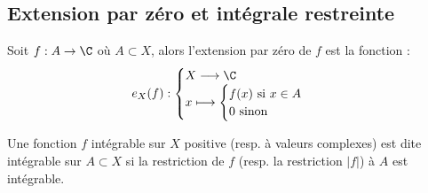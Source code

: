 \subsection{Extension par zéro et intégrale restreinte}

\begin{definition}
    Soit $f : A \rightarrow \C$ où $A \subset X$, alors l'extension par zéro de $f$ est la fonction :
        \[ e_X(f) : 
            \begin{cases}
                X \longrightarrow \C \\
                x \longmapsto \begin{cases}
                                    f(x) \text{ si } x \in A \\
                                    0 \text{ sinon }
                                \end{cases}
            \end{cases} \] 
\end{definition}

\begin{definition}
    Une fonction $f$ intégrable sur $X$ positive (resp. à valeurs complexes) est dite intégrable sur $A \subset X$ si la restriction de $f$ (resp. la restriction $|f|$) à $A$ est intégrable.
\end{definition}

\newpage 

